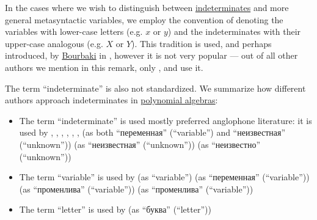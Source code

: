 \begin{remark}\label{rem:conventions_for_indeterminates}
  In the cases where we wish to distinguish between \hyperref[con:indeterminate]{indeterminates} and more general metasyntactic variables, we employ the convention of denoting the variables with lower-case letters (e.g. \( x \) or \( y \)) and the indeterminates with their upper-case analogous (e.g. \( X \) or \( Y \)). This tradition is used, and perhaps introduced, by \hyperref[rem:bourbaki]{Bourbaki} in \cite[A III.25]{Bourbaki1970Algèbre1à3}, however it is not very popular --- out of all other authors we mention in this remark, only ,  and  use it.

  The term \enquote{indeterminate} is also not standardized. We summarize how different authors approach indeterminates in \hyperref[def:polynomial_algebra]{polynomial algebras}:
  \begin{itemize}
    \item The term \enquote{indeterminate} is used mostly preferred anglophone literature:  it is used by
    ,
    ,
    ,
    ,
    ,
    ,
     (as both \enquote{переменная} (\enquote{variable}) and \enquote{неизвестная} (\enquote{unknown}))
     (as \enquote{неизвестная} (\enquote{unknown}))
     (as \enquote{неизвестно} (\enquote{unknown}))

    \item The term \enquote{variable} is used by
     (as \enquote{variable})
     (as \enquote{переменная} (\enquote{variable}))
     (as \enquote{променлива} (\enquote{variable}))
     (as \enquote{променлива} (\enquote{variable}))

    \item The term \enquote{letter} is used by
     (as \enquote{буква} (\enquote{letter}))
  \end{itemize}
\end{remark}

